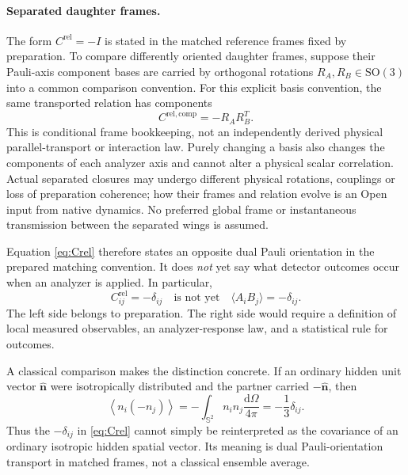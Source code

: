 \documentclass[11pt]{article}
\theoremstyle{remark}
\newcommand{\dd}{\mathrm{d}}
\newcommand{\SSph}{\mathbb{S}^{2}}
\newcommand{\SO}{\mathrm{SO}(3)}
\newcommand{\nhat}{\hat{\bm n}}
\newcommand{\Crel}{C^{\mathrm{rel}}}
\begin{document}
\paragraph{Separated daughter frames.}
The form \(\Crel=-I\) is stated in the matched reference frames fixed by
preparation.  To compare differently oriented daughter frames, suppose their
Pauli-axis component bases are carried by orthogonal rotations
\(R_A,R_B\in\SO\) into a common comparison convention.  For this
explicit basis convention, the same transported relation has components
\begin{equation}
  C^{\mathrm{rel,comp}}=-R_A R_B^T.
  \label{eq:frame_transport}
\end{equation}
This is conditional frame bookkeeping, not an independently derived
physical parallel-transport or interaction law.  Purely changing a basis
also changes the components of each analyzer axis and cannot alter a
physical scalar correlation.  Actual separated closures may undergo
different physical rotations, couplings or loss of preparation coherence;
how their frames and relation evolve is an Open input from native dynamics.
No preferred global frame or instantaneous transmission between the
separated wings is assumed.

Equation \eqref{eq:Crel} therefore states an opposite dual Pauli
orientation in the prepared matching convention.  It does \emph{not} yet
say what detector outcomes occur when an analyzer is applied.  In particular,
\begin{equation}
  \boxed{
  \Crel_{ij}=-\delta_{ij}
  \quad\text{is not yet}\quad
  \langle A_iB_j\rangle=-\delta_{ij}.}
  \label{eq:rel_not_cov}
\end{equation}
The left side belongs to preparation.  The right side would require a definition of local measured
observables, an analyzer-response law, and a statistical rule for outcomes.

A classical comparison makes the distinction concrete.  If an ordinary hidden unit vector
\(\nhat\) were isotropically distributed and the partner carried \(-\nhat\), then
\begin{equation}
  \left\langle n_i(-n_j)\right\rangle
  =-\int_{\SSph}n_i n_j\frac{\dd\Omega}{4\pi}
  =-\frac13\delta_{ij}.
  \label{eq:classical_covariance}
\end{equation}
Thus the \(-\delta_{ij}\) in \eqref{eq:Crel} cannot simply be reinterpreted as the covariance of an
ordinary isotropic hidden spatial vector.  Its meaning is dual Pauli-orientation transport in matched frames, not a
classical ensemble average.
\end{document}
